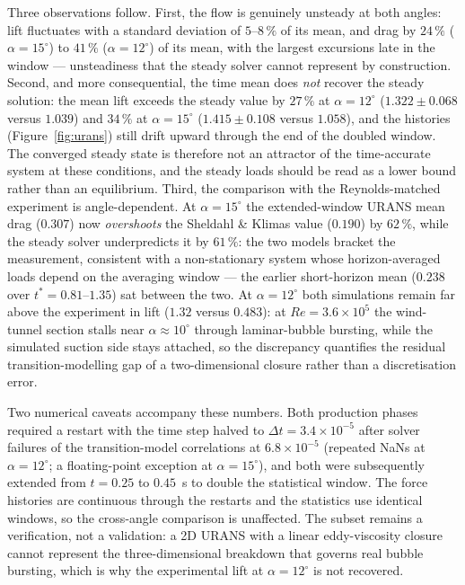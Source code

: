 \documentclass[11pt,a4paper]{article}
\begin{document}
Three observations follow. First, the flow is genuinely unsteady at both angles: lift fluctuates with a standard deviation of $5$--$8\,\%$ of its mean, and drag by $24\,\%$ ($\alpha = 15^\circ$) to $41\,\%$ ($\alpha = 12^\circ$) of its mean, with the largest excursions late in the window --- unsteadiness that the steady solver cannot represent by construction. Second, and more consequential, the time mean does \emph{not} recover the steady solution: the mean lift exceeds the steady value by $27\,\%$ at $\alpha = 12^\circ$ ($1.322 \pm 0.068$ versus $1.039$) and $34\,\%$ at $\alpha = 15^\circ$ ($1.415 \pm 0.108$ versus $1.058$), and the histories (Figure~\ref{fig:urans}) still drift upward through the end of the doubled window. The converged steady state is therefore not an attractor of the time-accurate system at these conditions, and the steady loads should be read as a lower bound rather than an equilibrium. Third, the comparison with the Reynolds-matched experiment is angle-dependent. At $\alpha = 15^\circ$ the extended-window URANS mean drag ($0.307$) now \emph{overshoots} the Sheldahl \& Klimas value ($0.190$) by $62\,\%$, while the steady solver underpredicts it by $61\,\%$: the two models bracket the measurement, consistent with a non-stationary system whose horizon-averaged loads depend on the averaging window --- the earlier short-horizon mean ($0.238$ over $t^* = 0.81$--$1.35$) sat between the two. At $\alpha = 12^\circ$ both simulations remain far above the experiment in lift ($1.32$ versus $0.483$): at $Re = 3.6\times10^5$ the wind-tunnel section stalls near $\alpha \approx 10^\circ$ through laminar-bubble bursting, while the simulated suction side stays attached, so the discrepancy quantifies the residual transition-modelling gap of a two-dimensional closure rather than a discretisation error.

Two numerical caveats accompany these numbers. Both production phases required a restart with the time step halved to $\Delta t = 3.4\times10^{-5}$ after solver failures of the transition-model correlations at $6.8\times10^{-5}$ (repeated NaNs at $\alpha = 12^\circ$; a floating-point exception at $\alpha = 15^\circ$), and both were subsequently extended from $t = 0.25$ to $0.45$~s to double the statistical window. The force histories are continuous through the restarts and the statistics use identical windows, so the cross-angle comparison is unaffected. The subset remains a verification, not a validation: a 2D URANS with a linear eddy-viscosity closure cannot represent the three-dimensional breakdown that governs real bubble bursting, which is why the experimental lift at $\alpha = 12^\circ$ is not recovered.
\end{document}
